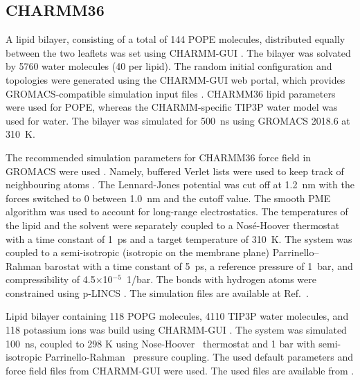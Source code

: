 \documentclass[journal=jpcbfk]{achemso}
\begin{document}
\clearpage

\subsection{CHARMM36}

 A lipid bilayer, consisting of a total of 144 POPE molecules, distributed equally between the two leaflets was set using CHARMM-GUI \cite{lee16}. The bilayer was solvated by 5760 water molecules (40 per lipid). The random initial configuration and topologies were generated using the CHARMM-GUI web portal, which provides  GROMACS-compatible simulation input files \cite{lee16}. CHARMM36 lipid parameters \cite{klauda10} were used for POPE, whereas the CHARMM-specific TIP3P water model \cite{jorgensen83} was used for water. The bilayer was simulated for 500~ns using GROMACS 2018.6 at 310~K.

The recommended simulation parameters for CHARMM36 force field in GROMACS were used \cite{lee16}. Namely, buffered Verlet lists were used to keep track of neighbouring atoms \cite{Pall13}. The Lennard-Jones potential was cut off at 1.2~nm with the forces switched to 0 between 1.0~nm and the cutoff value. The smooth PME algorithm \cite{darden93,essman95} was used to account for long-range electrostatics. The temperatures of the lipid and the solvent were separately coupled to a Nos\'{e}-Hoover thermostat \cite{nose84,hoover85} with a time constant of 1~ps and a target temperature of 310~K. The system was coupled to a semi-isotropic (isotropic on the membrane plane) Parrinello--Rahman barostat \cite{parrinello81} with a time constant of 5~ps, a reference pressure of 1~bar, and compressibility of 4.5$\times$10$^{-5}$~1/bar. The bonds with hydrogen atoms were constrained using p-LINCS \cite{hess07,hess97}. The simulation files are available at Ref.~.


 Lipid bilayer containing 118 POPG molecules, 4110 TIP3P water molecules, and 118 potassium ions was build using CHARMM-GUI \cite{lee16}.
The system was simulated 100~ns, coupled to 298 K using Nose-Hoover~\cite{nose84,hoover85} thermostat and 1 bar with
semi-isotropic Parrinello-Rahman~\cite{parrinello81} pressure coupling.
The used default parameters and force field files from CHARMM-GUI were used.
The used files are available from .
\end{document}
